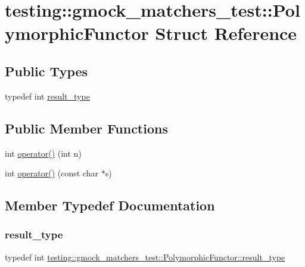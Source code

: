 \hypertarget{structtesting_1_1gmock__matchers__test_1_1_polymorphic_functor}{}\section{testing\+:\+:gmock\+\_\+matchers\+\_\+test\+:\+:Polymorphic\+Functor Struct Reference}
\label{structtesting_1_1gmock__matchers__test_1_1_polymorphic_functor}
\subsection*{Public Types}
\begin{DoxyCompactItemize}
\item 
typedef int \hyperlink{structtesting_1_1gmock__matchers__test_1_1_polymorphic_functor_ae2b921ecae158b5eaa11a29ac6fe0cf3}{result\+\_\+type}
\end{DoxyCompactItemize}
\subsection*{Public Member Functions}
\begin{DoxyCompactItemize}
\item 
int \hyperlink{structtesting_1_1gmock__matchers__test_1_1_polymorphic_functor_a2fb8b012acd2ccd52788231036877c98}{operator()} (int n)
\item 
int \hyperlink{structtesting_1_1gmock__matchers__test_1_1_polymorphic_functor_aee4d200c7f85ce4d8048d1798a511002}{operator()} (const char $\ast$s)
\end{DoxyCompactItemize}


\subsection{Member Typedef Documentation}
\mbox{\label{structtesting_1_1gmock__matchers__test_1_1_polymorphic_functor_ae2b921ecae158b5eaa11a29ac6fe0cf3}} 
\subsubsection{\texorpdfstring{result\+\_\+type}{result\_type}}
{\footnotesize\ttfamily typedef int \hyperlink{structtesting_1_1gmock__matchers__test_1_1_polymorphic_functor_ae2b921ecae158b5eaa11a29ac6fe0cf3}{testing\+::gmock\+\_\+matchers\+\_\+test\+::\+Polymorphic\+Functor\+::result\+\_\+type}}




